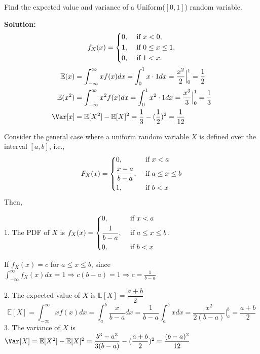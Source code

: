 \begin{eg}
    Find the expected value and variance of a Uniform(\([0, 1]\)) random variable.

    \textbf{Solution:} 
    \[
        f_X(x) = \begin{dcases}
            0, &\text{ if } x < 0 ,\\
            1, &\text{ if } 0 \leq x \leq 1 ,\\
            0, &\text{ if } 1 < x.
        \end{dcases}
    \]
    \[
    \begin{aligned}
        \mathbb{E}(x) &= \int_{-\infty} ^{\infty} xf(x)dx = \int_{0}^{1} x \cdot 1 dx = \dfrac{x^2}{2} \Big|_0^1 = \frac{1}{2} \\
        \mathbb{E}(x^2) &= \int_{-\infty} ^{\infty} x^2f(x)dx = \int_{0}^{1} x^2 \cdot 1 dx = \dfrac{x^3}{3} \Big|_0^1 = \frac{1}{3} \\
        \Var[x] &= \mathbb{E}[X^2] - \mathbb{E}[X]^2 = \dfrac{1}{3} - (\dfrac{1}{2})^2 = \dfrac{1}{12}
    \end{aligned}
    \]
\end{eg}

Consider the general case where a uniform random variable \(X\) is defined over the interval \([a, b]\), i.e.,
\[
    F_X(x) = \begin{dcases}
        0, &\text{ if } x < a \\
        \frac{x - a}{b - a}, &\text{ if } a \leq x \leq b \\
        1 , &\text{ if } b < x
    \end{dcases}
\]
Then,

1. The PDF of \(X\) is \(f_X(x) = \begin{dcases}
        0, &\text{ if } x < a \\
        \frac{1}{b - a}, &\text{ if } a \leq x \leq b \\
        0 , &\text{ if } b < x
    \end{dcases}\). 
    
    If \(f_X(x) = c\) for \(a \leq x \leq b\), since \(\displaystyle\int_{-\infty} ^{\infty} f_X(x)dx = 1 \Rightarrow c(b - a) = 1 \Rightarrow c = \frac{1}{b - a}\)

2. The expected value of \(X\) is \(\mathbb{E}[X] = \dfrac{a + b}{2}\)
    \[
        \mathbb{E}[X] = \int_{-\infty} ^{\infty} xf(x)dx = \int_{a} ^{b} \dfrac{x}{b - a}dx = \dfrac{1}{b - a}\int_{a} ^{b} xdx = \dfrac{x^2}{2(b - a)} \Big|_a^b = \dfrac{a + b}{2}
    \]
3. The variance of \(X\) is \(\Var[X] = \mathbb{E}[X^2] - \mathbb{E}[X]^2 = \dfrac{b^3 - a^3}{3(b - a)} - (\dfrac{a + b}{2})^2 = \dfrac{(b - a)^2}{12}\)
    
